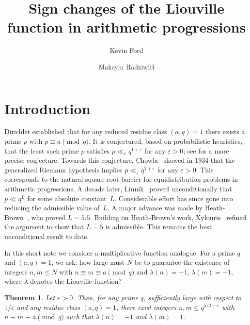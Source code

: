 \documentclass[11pt]{amsart}
\title{Sign changes of the Liouville function in arithmetic progressions}
\author{Kevin Ford}
\author{Maksym Radziwi\l\l}
\newtheorem{theorem}{Theorem}
\begin{document}

\maketitle

\section{Introduction}
 
Dirichlet established that for any reduced residue class $(a,q) = 1$ there exists a prime $p$ with $p \equiv a \pmod{q}$. It is conjectured, based on probabilistic heuristics, that the least such prime $p$ satisfies $p \ll_\varepsilon q^{1 + \varepsilon}$ for any $\varepsilon > 0$;
see \cite{LPS} for a more precise conjecture.
 Towards this conjecture,
Chowla~\cite{Chowla} showed in 1934 that the generalized Riemann
hypothesis implies $p \ll_\varepsilon q^{2+\varepsilon}$ for any $\varepsilon > 0$. This corresponds to the natural
square root barrier for equidistribution problems in arithmetic
progressions. A decade later, Linnik~\cite{Linnik1, Linnik2} proved
unconditionally that $p \ll q^{L}$ for some absolute constant~$L$.
Considerable effort has since gone into reducing the admissible value
of~$L$. A major advance was made by Heath-Brown~\cite{HeathBrown}, who
proved $L = 5.5$. Building on Heath-Brown's work,
Xylouris~\cite{Xylouris} refined the argument to show that $L = 5$
is admissible. This remains the best unconditional result to date.

In this short note we consider a multiplicative function analogue. For a prime $q$ and $(a,q) = 1$, we ask: how large must $N$ be to guarantee the existence of integers $n, m \leq N$ with $n \equiv m \equiv a \pmod{q}$ and $\lambda(n) = -1$, $\lambda(m) = +1$, where $\lambda$ denotes the Liouville function?
 
\begin{theorem}\label{thm:main}
    Let $\varepsilon > 0$. Then, for any prime $q$, sufficiently large with respect to $1 / \varepsilon$ and any residue class $(a,q) = 1$, there exist integers $n,m \leq q^{5/2 + \varepsilon}$ with $n \equiv m \equiv a \pmod{q}$ such that $\lambda(n) = -1$ and $\lambda(m) = 1$.  
\end{theorem}
 
\end{document}
